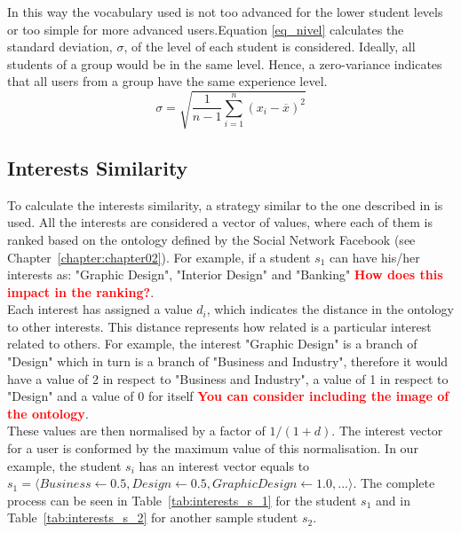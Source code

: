 In this way the vocabulary used is not too advanced for the lower student levels or too simple for more advanced users.Equation \ref{eq_nivel} calculates the standard deviation, $\sigma$, of the level of each student is considered. Ideally, all students of a group would be in the same level. Hence, a zero-variance indicates that all users from a group have the same experience level.\\

\begin{equation} \label{eq_nivel}
    \sigma = \sqrt{\frac{1}{n-1} \sum_{i=1}^n (x_i - \overline{x})^2}
\end{equation}


\subsection{Interests Similarity}

To calculate the interests similarity, a strategy similar to the one described in \cite{taxonomy_semantic_similarity} is used. All the interests are considered a vector of values, where each of them is ranked based on the ontology defined by the Social Network Facebook (see Chapter~\ref{chapter:chapter02}). For example, if a student $s_1$ can have his/her interests as: "Graphic Design", "Interior Design" and "Banking" \textcolor{red}{\bf How does this impact in the ranking?}.\\ 

Each interest has assigned a value $d_i$, which indicates the distance in the ontology to other interests. This distance represents how related is a particular interest related to others. For example, the interest "Graphic Design" is a branch of "Design" which in turn is a branch of "Business and Industry", therefore it would have a value of 2 in respect to "Business and Industry", a value of 1 in respect to "Design" and a value of 0 for itself \textcolor{red}{\bf You can consider including the image of the ontology}.\\

These values are then normalised by a factor of $1/(1+d)$. The interest vector for a user is conformed by the maximum value of this normalisation. In our example, the student $s_i$ has an interest vector equals to $s_1 = \langle Business \gets 0.5, Design \gets 0.5, Graphic Design \gets 1.0,...\rangle$. The complete process can be seen in Table~\ref{tab:interests_s_1} for the student $s_1$ and in Table~\ref{tab:interests_s_2} for another sample student $s_2$.\\

